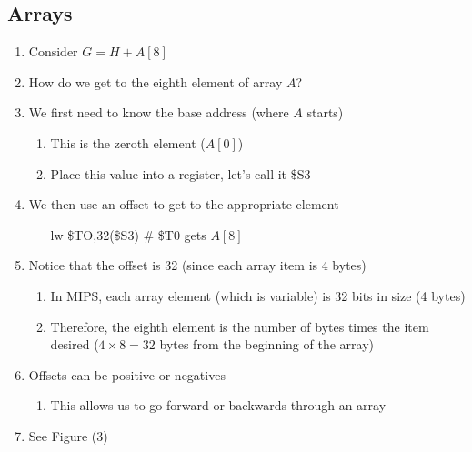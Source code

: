 \documentclass[12pt]{article}
\begin{document}
\subsection{Arrays}
\begin{enumerate}
  \item Consider $G=H+A[8]$
  \item How do we get to the eighth element of array $A$?
  \item We first need to know the base address (where $A$ starts)
  \begin{enumerate}
    \item This is the zeroth element ($A[0]$)
    \item Place this value into a register, let's call it \$S3
  \end{enumerate}
  \item We then use an offset to get to the appropriate element
  \begin{enumerate}
    \item[lw] \$TO,32(\$S3) \# \$T0 gets $A[8]$
  \end{enumerate}
  \item Notice that the offset is 32 (since each array item is 4 bytes)
  \begin{enumerate}
    \item In MIPS, each array element (which is variable) is 32 bits in size (4 bytes)
    \item Therefore, the eighth element is the number of bytes times the item desired ($4\times8=32$ bytes from the beginning of the array)
  \end{enumerate}
  \item Offsets can be positive or negatives
  \begin{enumerate}
    \item This allows us to go forward or backwards through an array
  \end{enumerate}
  \item See Figure (3)
\end{enumerate}
\end{document}
